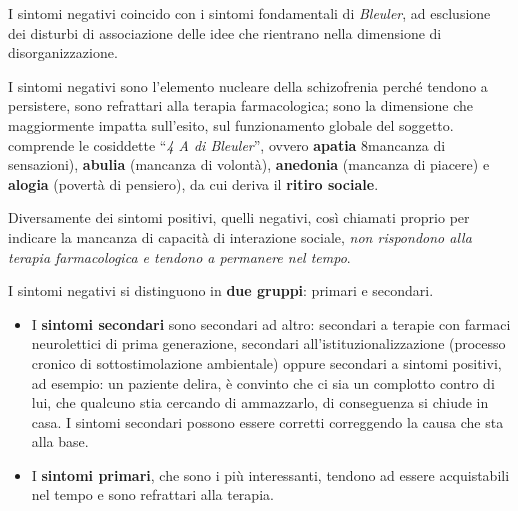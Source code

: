 \documentclass[]{article}
\begin{document}
I sintomi negativi coincido con i sintomi fondamentali di
\emph{Bleuler}, ad esclusione dei disturbi di associazione delle idee
che rientrano nella dimensione di disorganizzazione.

I sintomi negativi sono l'elemento nucleare della schizofrenia perché
tendono a persistere, sono refrattari alla terapia farmacologica; sono
la dimensione che maggiormente impatta sull'esito, sul funzionamento
globale del soggetto. comprende le cosiddette ``\emph{4 A di Bleuler}'',
ovvero \textbf{apatia} 8mancanza di sensazioni), \textbf{abulia}
(mancanza di volontà), \textbf{anedonia} (mancanza di piacere) e
\textbf{alogia} (povertà di pensiero), da cui deriva il \textbf{ritiro
sociale}.

Diversamente dei sintomi positivi, quelli negativi, così chiamati
proprio per indicare la mancanza di capacità di interazione sociale,
\emph{non rispondono alla terapia farmacologica e tendono a permanere
nel tempo}.

I sintomi negativi si distinguono in \textbf{due gruppi}: primari e
secondari.

\begin{itemize}
\item
  I \textbf{sintomi secondari} sono secondari ad altro: secondari a
  terapie con farmaci neurolettici di prima generazione, secondari
  all'istituzionalizzazione (processo cronico di sottostimolazione
  ambientale) oppure secondari a sintomi positivi, ad esempio: un
  paziente delira, è convinto che ci sia un complotto contro di lui, che
  qualcuno stia cercando di ammazzarlo, di conseguenza si chiude in
  casa. I sintomi secondari possono essere corretti correggendo la causa
  che sta alla base.
\item
  I \textbf{sintomi primari}, che sono i più interessanti, tendono ad
  essere acquistabili nel tempo e sono refrattari alla terapia.
\end{itemize}
\end{document}
